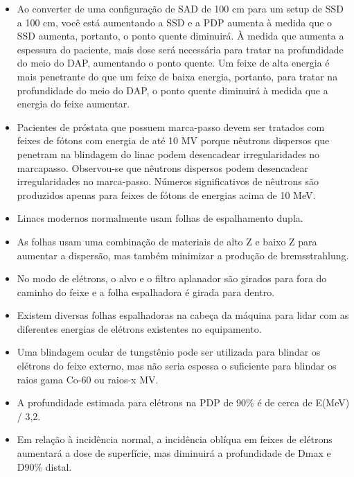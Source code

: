 \documentclass[11pt,a4paper]{article}
\newcounter{exemplo}
\begin{document}
\begin{exemplo}[Radioterapia]
\begin{itemize}
        \item Ao converter de uma configuração de SAD de 100 cm para um setup de SSD a 100 cm, você está aumentando a SSD e a PDP aumenta à medida que o SSD aumenta, portanto, o ponto quente diminuirá. À medida que aumenta a espessura do paciente, mais dose será necessária para tratar na profundidade do meio do DAP, aumentando o ponto quente. Um feixe de alta energia é mais penetrante do que um feixe de baixa energia, portanto, para tratar na profundidade do meio do DAP, o ponto quente diminuirá à medida que a energia do feixe aumentar.
        
        \item Pacientes de próstata que possuem marca-passo devem ser tratados com feixes de fótons com energia de até 10 MV  porque nêutrons dispersos que penetram na blindagem do linac podem desencadear irregularidades no marcapasso. Observou-se que nêutrons dispersos podem desencadear irregularidades no marca-passo. Números significativos de nêutrons são produzidos apenas para feixes de fótons de energias acima de 10 MeV.
        
        \item Linacs modernos normalmente usam folhas de espalhamento dupla.
        
        \item As folhas usam uma combinação de materiais de alto Z e baixo Z para aumentar a dispersão, mas também minimizar a produção de bremsstrahlung.
        
        \item No modo de elétrons, o alvo e o filtro aplanador são girados para fora do caminho do feixe e a folha espalhadora é girada para dentro.
    
        \item Existem diversas folhas espalhadoras na cabeça da máquina para lidar com as diferentes energias de elétrons existentes no equipamento.
        
        \item Uma blindagem ocular de tungstênio pode ser utilizada para blindar os elétrons do feixe externo, mas não seria espessa o suficiente para blindar os raios gama Co-60 ou raios-x MV.
        
        \item A profundidade estimada para elétrons na PDP de 90\% é de cerca de E(MeV) / 3,2.
        
        \item Em relação à incidência normal, a incidência oblíqua em feixes de elétrons aumentará a dose de superfície, mas diminuirá a profundidade de Dmax e D90\% distal.
        

\end{itemize}
\end{exemplo}
\end{document}
